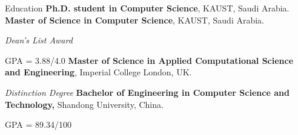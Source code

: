 \begin{rubric}{Education}
%
	\textbf{Ph.D. student in Computer Science}, KAUST, Saudi Arabia.
%
%
	\textbf{Master of Science in Computer Science}, KAUST, Saudi Arabia.
	\par \textit{Dean's List Award} 
	\par GPA = 3.88/4.0
% 
%
	\textbf{Master of Science in Applied Computational Science and Engineering}, Imperial College London, UK.
	\par \textit{Distinction Degree}
%
	\textbf{Bachelor of Engineering in Computer Science and Technology,} Shandong University, China.
	\par GPA = 89.34/100
\end{rubric}